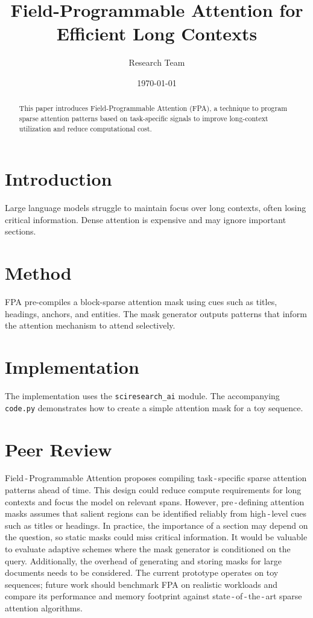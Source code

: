 \documentclass{article}
\title{Field-Programmable Attention for Efficient Long Contexts}
\author{Research Team}
\date{\today}
\begin{document}
\maketitle

\begin{abstract}
This paper introduces Field-Programmable Attention (FPA), a technique to
program sparse attention patterns based on task-specific signals to improve
long-context utilization and reduce computational cost.
\end{abstract}

\section{Introduction}
Large language models struggle to maintain focus over long contexts, often
losing critical information. Dense attention is expensive and may ignore
important sections.

\section{Method}
FPA pre-compiles a block-sparse attention mask using cues such as titles,
headings, anchors, and entities. The mask generator outputs patterns that
inform the attention mechanism to attend selectively.

\section{Implementation}
The implementation uses the \texttt{sciresearch\_ai} module. The accompanying
\texttt{code.py} demonstrates how to create a simple attention mask for a toy
sequence.

\section{Peer Review}
Field ‑ Programmable Attention proposes compiling task ‑ specific sparse
attention patterns ahead of time.  This design could reduce compute
requirements for long contexts and focus the model on relevant spans.
However, pre ‑ defining attention masks assumes that salient regions can be
identified reliably from high ‑ level cues such as titles or headings.  In
practice, the importance of a section may depend on the question, so static
masks could miss critical information.  It would be valuable to evaluate
adaptive schemes where the mask generator is conditioned on the query.
Additionally, the overhead of generating and storing masks for large
documents needs to be considered.  The current prototype operates on toy
sequences; future work should benchmark FPA on realistic workloads and
compare its performance and memory footprint against state ‑ of ‑ the ‑ art
sparse attention algorithms.
\end{document}
